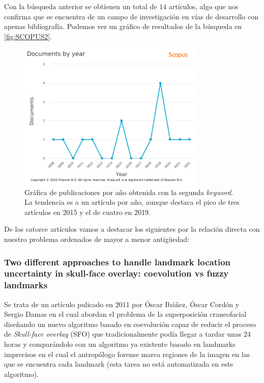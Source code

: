             \medskip

            \noindent Con la búsqueda anterior se obtienen un total de $14$ artículos, algo que nos confirma que se encuentra de un campo de investigación en vías de desarrollo con apenas bibliografía. Podemos ver un gráfico de resultados de la búsqueda en \autoref{fig:SCOPUS2}.

            \begin{figure}[!h]
                \centering
                \includegraphics[width=0.8\textwidth]{img/Scopus_2.png}
                \caption{Gráfica de publicaciones por año obtenida con la segunda \textit{keyword}. La tendencia es a un artículo por año, aunque destaca el pico de tres artículos en 2015 y el de cuatro en 2019.}
                \label{fig:SCOPUS2}
            \end{figure}

            \medskip

            \noindent De los catorce artículos vamos a destacar los siguientes por la relación directa con nuestro problema ordenados de mayor a menor antigüedad: 

            \subsubsection{Two diﬀerent approaches to handle landmark location uncertainty in skull-face overlay: coevolution vs fuzzy landmarks}
                \noindent Se trata de un artículo pulicado en $2011$ por Óscar Ibáñez, Óscar Cordón y Sergio Damas \cite{ibanez2011two} en el cual abordan el problema de la superposición craneofacial diseñando un nuevo algoritmo basado en coevolución capaz de reducir el proceso de \textit{Skull-face overlay} (SFO) que tradicionalmente podía llegar a tardar unas 24 horas y comparándolo con un algoritmo ya existente basado en landmarks imprecisos en el cual el antropólogo forense marca regiones de la imagen en las que se encuentra cada landmark (esta tarea no está automatizada en este algoritmo).

